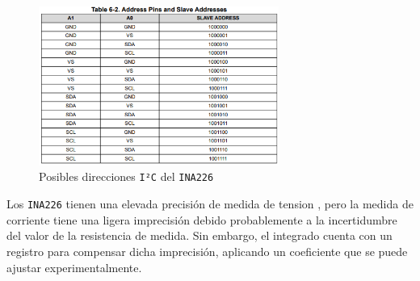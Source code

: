 \begin{figure}[H]
    \centering
    \includegraphics[width=0.7\textwidth]{images/2-hardware/componentes/direcciones_ina.png}
    \caption{Posibles direcciones \texttt{I²C} del \texttt{INA226}}
    \label{fig:hardware/modulos/direcciones_ina}
\end{figure}

Los \texttt{INA226} tienen una elevada precisión de medida de tension , pero la medida de corriente tiene una ligera imprecisión debido probablemente a la incertidumbre del valor de la resistencia de medida. Sin embargo, el integrado cuenta con un registro para compensar dicha imprecisión, aplicando un coeficiente que se puede ajustar experimentalmente.